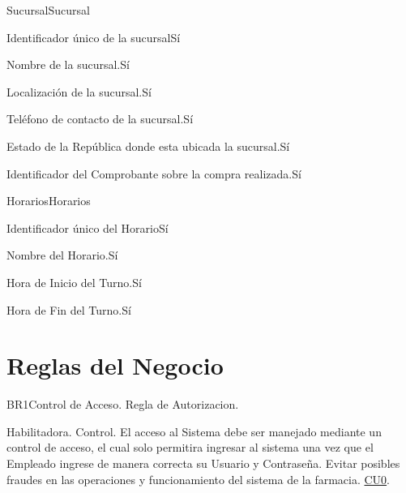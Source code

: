 \begin{cdtEntidad}{Sucursal}{Sucursal}

		{Identificador único de la sucursal}{Sí}
		
		{Nombre de la sucursal.}{Sí}

		{Localización de la sucursal.}{Sí}
	
		{Teléfono de contacto de la sucursal.}{Sí}
		
		{Estado de la República donde esta ubicada la sucursal.}{Sí}
		
		{Identificador del Comprobante sobre la compra realizada.}{Sí}	

\end{cdtEntidad}

\begin{cdtEntidad}{Horarios}{Horarios}

		{Identificador único del Horario}{Sí}
		
		{Nombre del Horario.}{Sí}

		{Hora de Inicio del Turno.}{Sí}
	
		{Hora de Fin del Turno.}{Sí}
		
\end{cdtEntidad}




\newpage
\section{Reglas del Negocio}
\begin{BussinesRule}{BR1}{Control de Acceso.}
	\BRitem[Tipo:] Regla de Autorizacion. 
				
	\BRitem[Clase:] Habilitadora. 
	\BRitem[Nivel:] Control. %
	\BRitem[Descripción:]	El acceso al Sistema debe ser manejado mediante un control de acceso, el cual solo permitira ingresar al sistema una vez que el Empleado ingrese de manera correcta su Usuario y Contraseña.
	\BRitem[Motivación:] Evitar posibles fraudes en las operaciones y funcionamiento del sistema de la farmacia.
	 \hyperlink{CU0}{CU0}.
\end{BussinesRule}

